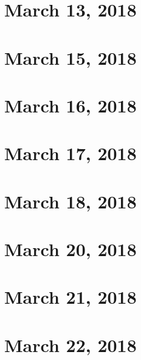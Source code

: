 \section{March 13, 2018}




\section{March 15, 2018}



\section{March 16, 2018}

\section{March 17, 2018}

\section{March 18, 2018}

\section{March 20, 2018}





\section{March 21, 2018}

\section{March 22, 2018}



